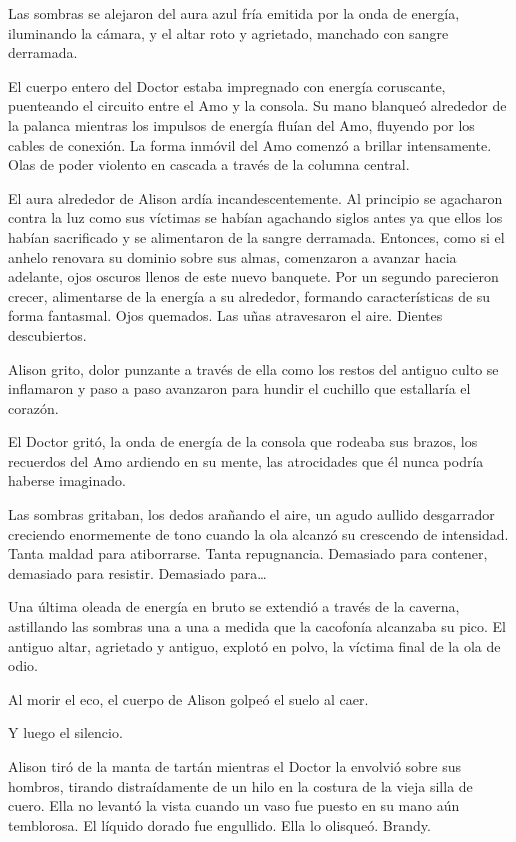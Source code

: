 {Las sombras se alejaron del aura azul fría emitida por la onda de
 energía, iluminando la cámara, y el altar roto y agrietado, manchado con
sangre derramada.}

{El cuerpo entero del Doctor estaba impregnado con energía coruscante,
 puenteando el circuito entre el Amo y la consola. Su mano blanqueó
 alrededor de la palanca mientras los impulsos de energía fluían del Amo,
 fluyendo por los cables de conexión. La forma inmóvil del Amo comenzó a
 brillar intensamente. Olas de poder violento en cascada a través de la
columna central.}

{El aura alrededor de Alison ardía
 incandescentemente. Al principio se agacharon contra la luz como sus
 víctimas se habían agachando siglos antes ya que ellos los habían
 sacrificado y se alimentaron de la sangre derramada. Entonces, como si
 el anhelo renovara su dominio sobre sus almas, comenzaron a avanzar
 hacia adelante, ojos oscuros llenos de este nuevo banquete. Por un
 segundo parecieron crecer, alimentarse de la energía a su alrededor,
 formando características de su forma fantasmal. Ojos quemados. Las uñas
atravesaron el aire. Dientes descubiertos.}

{Alison grito, dolor punzante a través de ella como los restos del
 antiguo culto se inflamaron y paso a paso avanzaron para hundir el
cuchillo que estallaría el corazón.}

{El Doctor gritó, la onda de energía de la consola que rodeaba sus
 brazos, los recuerdos del Amo ardiendo en su mente, las atrocidades que
él nunca podría haberse imaginado.}

{Las sombras gritaban, los dedos arañando el aire, un agudo aullido
 desgarrador creciendo enormemente de tono cuando la ola alcanzó su
 crescendo de intensidad. Tanta maldad para atiborrarse. Tanta
 repugnancia. Demasiado para contener, demasiado para resistir. Demasiado
 para\ldots{}}

{Una última oleada de energía en bruto se extendió a través de la
 caverna, astillando las sombras una a una a medida que la cacofonía
 alcanzaba su pico. El antiguo altar, agrietado y antiguo, explotó en
polvo, la víctima final de la ola de odio.}

{Al morir el eco, el cuerpo de Alison golpeó el suelo al caer.}

{Y luego el silencio.}

{Alison tiró de la manta de tartán
 mientras el Doctor la envolvió sobre sus hombros, tirando distraídamente
 de un hilo en la costura de la vieja silla de cuero. Ella no levantó la
 vista cuando un vaso fue puesto en su mano aún temblorosa. El líquido
dorado fue engullido. Ella lo olisqueó. Brandy.}

